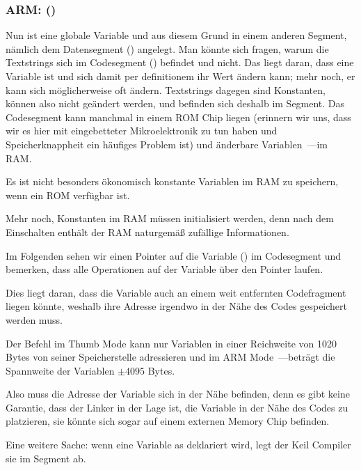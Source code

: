 \subsubsection{ARM: \OptimizingKeilVI (\ThumbMode)}


Nun ist  eine globale Variable und aus diesem Grund in einem anderen Segment, nämlich dem Datensegment
() angelegt. Man könnte sich fragen, warum die Textstrings sich im Codesegment () befindet und
 nicht. Das liegt daran, dass  eine Variable ist und sich damit per definitionem ihr Wert ändern kann; mehr
noch, er kann sich möglicherweise oft ändern. Textstrings dagegen sind Konstanten, können also nicht geändert werden,
und befinden sich deshalb im  Segment.
\myindex{\RAM}
\myindex{\ROM}
Das Codesegment kann manchmal in einem \ac{ROM} Chip liegen (erinnern wir uns, dass wir es hier mit eingebetteter
Mikroelektronik zu tun haben und Speicherknappheit ein häufiges Problem ist) und änderbare Variablen~---im \ac{RAM}.

Es ist nicht besonders ökonomisch konstante Variablen im RAM zu speichern, wenn ein ROM verfügbar ist.

Mehr noch, Konstanten im RAM müssen initialisiert werden, denn nach dem Einschalten enthält der RAM naturgemäß zufällige
Informationen.

Im Folgenden sehen wir einen Pointer auf die Variable  () im Codesegment und bemerken, dass alle
Operationen auf der Variable über den Pointer laufen.

Dies liegt daran, dass die Variable  auch an einem weit entfernten Codefragment liegen könnte, weshalb ihre
Adresse irgendwo in der Nähe des Codes gespeichert werden muss.

Der Befehl  im Thumb Mode kann nur Variablen in einer Reichweite von 1020 Bytes von seiner Speicherstelle
adressieren und im ARM Mode~---beträgt die Spannweite der Variablen $\pm{}4095$ Bytes.

Also muss die Adresse der Variable  sich in der Nähe befinden, denn es gibt keine Garantie, dass der Linker in der
Lage ist, die Variable in der Nähe des Codes zu platzieren, sie könnte sich sogar auf einem externen Memory Chip
befinden.

\myindex{\ROM}
Eine weitere Sache: wenn eine Variable as  deklariert wird, legt der Keil Compiler sie im 
Segment ab.

